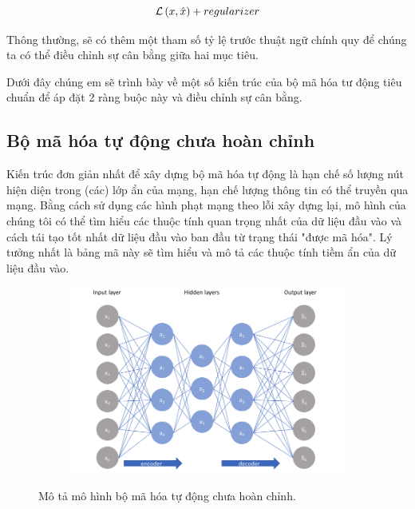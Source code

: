 \begin{equation}
    {\cal L}\left( {x,\hat x} \right) + regularizer
\end{equation}

Thông thường, sẽ có thêm một tham số tỷ lệ trước thuật ngữ chính quy để chúng ta
có thể điều chỉnh sự cân bằng giữa hai mục tiêu.

Dưới đây chúng em sẽ trình bày về một số kiến trúc của bộ mã hóa tư động
tiêu chuẩn để áp đặt 2 ràng buộc này và điều chỉnh sự cân bằng.



\subsection{Bộ mã hóa tự động chưa hoàn chỉnh}

Kiến trúc đơn giản nhất để xây dựng bộ mã hóa tự động là hạn chế số lượng
nút hiện diện trong (các) lớp ẩn của mạng, hạn chế lượng thông tin có
thể truyền qua mạng. Bằng cách sử dụng các hình phạt mạng theo lỗi xây dựng lại,
mô hình của chúng tôi có thể tìm hiểu các thuộc tính quan trọng nhất của dữ
liệu đầu vào và cách tái tạo tốt nhất dữ liệu đầu vào ban đầu từ trạng thái
"được mã hóa". Lý tưởng nhất là bảng mã này sẽ tìm hiểu và mô tả các thuộc
tính tiềm ẩn của dữ liệu đầu vào.

\begin{figure}
    \begin{subfigure}{0.8\textwidth}
        \includegraphics[width=1.\linewidth]{Chapters/items/auto2.jpg}
         
        \label{fig: auto2}
    \end{subfigure}
    \caption{Mô tả mô hình bộ mã hóa tự động chưa hoàn chỉnh.}
\end{figure}

